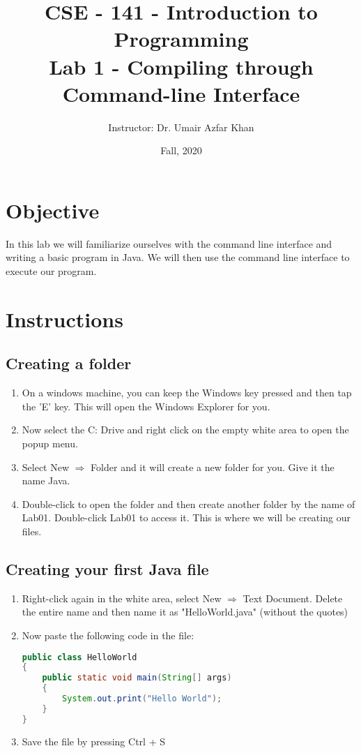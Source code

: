 \documentclass[a4paper]{article}
\title{CSE - 141 - Introduction to Programming\\ \vspace{5mm}
\large Lab 1 - Compiling through Command-line Interface}
\author{Instructor: Dr. Umair Azfar Khan}
\date{Fall, 2020}
\begin{document}
\maketitle


\section{Objective}
In this lab we will familiarize ourselves with the command line interface and writing a basic program in Java. We will then use the command line interface to execute our program.
\section{Instructions}

\subsection{Creating a folder}

\begin{enumerate}
\item On a windows machine, you can keep the Windows key pressed and then tap the 'E' key. This will open the Windows Explorer for you.
\item Now select the C: Drive and right click on the empty white area to open the popup menu.
\item Select New $\Rightarrow$ Folder and it will create a new folder for you. Give it the name Java.
\item Double-click to open the folder and then create another folder by the name of Lab01. Double-click Lab01 to access it. This is where we will be creating our files.
\end{enumerate}
\subsection{Creating your first Java file}

\begin{enumerate}
\item Right-click again in the white area, select New  $\Rightarrow$ Text Document. Delete the entire name and then name it as "HelloWorld.java" (without the quotes)
\item Now paste the following code in the file:
\begin{lstlisting}[language=Java]%, caption=HelloWorld example]
public class HelloWorld 
{
	public static void main(String[] args)
	{
		System.out.print("Hello World");
	}
}
\end{lstlisting}
\item Save the file by pressing Ctrl + S
\end{enumerate}
\end{document}
